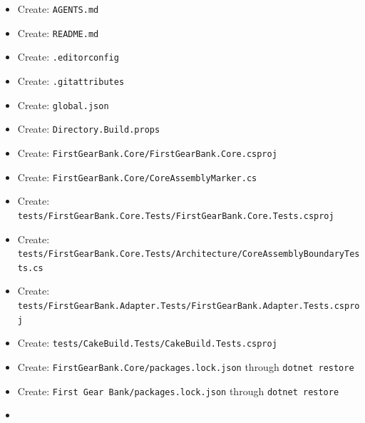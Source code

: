 \documentclass[
  10pt,
  letterpaper,
]{article}
\newcommand{\passthrough}[1]{#1}
\providecommand{\tightlist}{%
  \setlength{\itemsep}{0pt}\setlength{\parskip}{0pt}}
\begin{document}
\begin{itemize}
\tightlist
\item
  Create: \passthrough{\lstinline!AGENTS.md!}
\item
  Create: \passthrough{\lstinline!README.md!}
\item
  Create: \passthrough{\lstinline!.editorconfig!}
\item
  Create: \passthrough{\lstinline!.gitattributes!}
\item
  Create: \passthrough{\lstinline!global.json!}
\item
  Create: \passthrough{\lstinline!Directory.Build.props!}
\item
  Create:
  \texttt{FirstGearBank.}\allowbreak{}\texttt{Core/}\allowbreak{}\texttt{FirstGearBank.}\allowbreak{}\texttt{Core.}\allowbreak{}\texttt{csproj}
\item
  Create:
  \texttt{FirstGearBank.}\allowbreak{}\texttt{Core/}\allowbreak{}\texttt{CoreAssemblyMarker.}\allowbreak{}\texttt{cs}
\item
  Create:
  \texttt{tests/}\allowbreak{}\texttt{FirstGearBank.}\allowbreak{}\texttt{Core.}\allowbreak{}\texttt{Tests/}\allowbreak{}\texttt{FirstGearBank.}\allowbreak{}\texttt{Core.}\allowbreak{}\texttt{Tests.}\allowbreak{}\texttt{csproj}
\item
  Create:
  \texttt{tests/}\allowbreak{}\texttt{FirstGearBank.}\allowbreak{}\texttt{Core.}\allowbreak{}\texttt{Tests/}\allowbreak{}\texttt{Architecture/}\allowbreak{}\texttt{CoreAssemblyBoundaryTests.}\allowbreak{}\texttt{cs}
\item
  Create:
  \texttt{tests/}\allowbreak{}\texttt{FirstGearBank.}\allowbreak{}\texttt{Adapter.}\allowbreak{}\texttt{Tests/}\allowbreak{}\texttt{FirstGearBank.}\allowbreak{}\texttt{Adapter.}\allowbreak{}\texttt{Tests.}\allowbreak{}\texttt{csproj}
\item
  Create:
  \texttt{tests/}\allowbreak{}\texttt{CakeBuild.}\allowbreak{}\texttt{Tests/}\allowbreak{}\texttt{CakeBuild.}\allowbreak{}\texttt{Tests.}\allowbreak{}\texttt{csproj}
\item
  Create:
  \texttt{FirstGearBank.}\allowbreak{}\texttt{Core/}\allowbreak{}\texttt{packages.}\allowbreak{}\texttt{lock.}\allowbreak{}\texttt{json}
  through \passthrough{\lstinline!dotnet restore!}
\item
  Create:
  \texttt{First\ }\allowbreak{}\texttt{Gear\ }\allowbreak{}\texttt{Bank/}\allowbreak{}\texttt{packages.}\allowbreak{}\texttt{lock.}\allowbreak{}\texttt{json}
  through \passthrough{\lstinline!dotnet restore!}
\item

\end{itemize}
\end{document}
